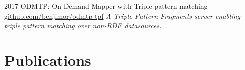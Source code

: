 \documentclass[]{friggeri-cv}
\begin{document}
\begin{entrylist}
  \entry
    {2017}
    {ODMTP: On Demand Mapper with Triple pattern matching\cite{moreau2017querying}}
    {\href{https://github.com/benjimor/odmtp-tpf}{github.com/benjimor/odmtp-tpf}}
    {\emph{A Triple Pattern Fragments server enabling triple pattern matching over non-RDF datasources.}}
\end{entrylist}

\section{Publications}

\nocite{*}
\printbibliography[sorting=chronological, heading=subbibliography, heading=none]
\end{document}
